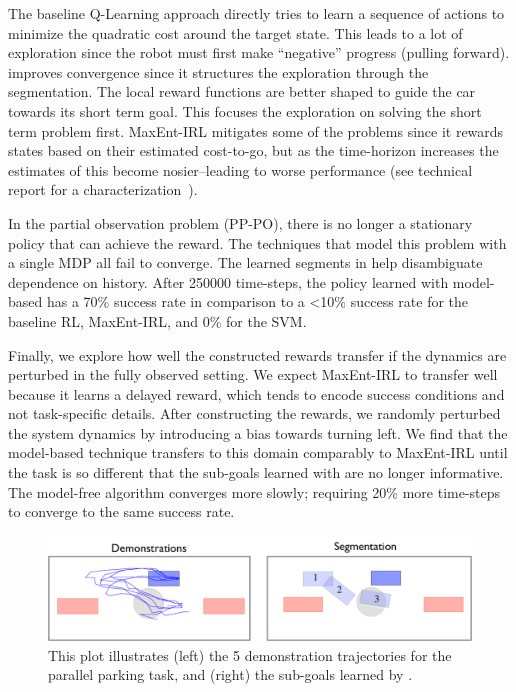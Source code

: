 The baseline Q-Learning approach directly tries to learn a sequence of actions to minimize the quadratic cost around the target state. 
This leads to a lot of exploration since the robot must first make ``negative'' progress (pulling forward). 
\hirl improves convergence since it structures the exploration through the segmentation.
The local reward functions are better shaped to guide the car towards its short term goal.
This focuses the exploration on solving the short term problem first.
MaxEnt-IRL mitigates some of the problems since it rewards states based on their estimated cost-to-go, but as the time-horizon increases the estimates of this become nosier--leading to worse performance (see technical report for a characterization~\cite{krishnan2016hirl}).

In the partial observation problem (PP-PO), there is no longer a stationary policy that can achieve the reward.
The techniques that model this problem with a single MDP all fail to converge.
The learned segments in \hirl help disambiguate dependence on history.
After 250000 time-steps, the policy learned with model-based \hirl has a 70\% success rate in comparison to a <10\% success rate for the baseline RL, MaxEnt-IRL, and 0\% for the SVM.

Finally, we explore how well the constructed rewards transfer if the dynamics are perturbed in the fully observed setting.
We expect MaxEnt-IRL to transfer well because it learns a delayed reward, which tends to encode success conditions and not task-specific details.
After constructing the rewards, we randomly perturbed the system dynamics by introducing a bias towards turning left.
We find that the model-based \hirl technique transfers to this domain comparably to MaxEnt-IRL until the task is so different that the sub-goals learned with \hirl are no longer informative.
The model-free \hirl algorithm converges more slowly; requiring 20\% more time-steps to converge to the same success rate. 


\begin{figure}[t]
\centering
 \includegraphics[width=\columnwidth]{exp/rc-car-segmentation.png}
 \caption{This plot illustrates (left) the 5 demonstration trajectories for the parallel parking task, and (right) the sub-goals learned by \hirl. \label{exp:rcsegmentation}}
\end{figure}


